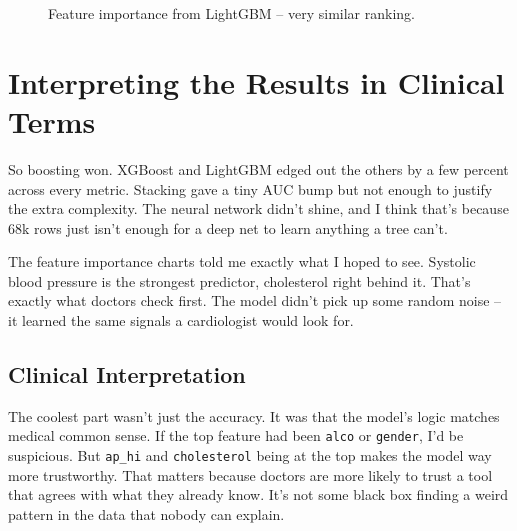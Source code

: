 \documentclass[12pt, a4paper, oneside]{book}
\begin{document}
\begin{figure}[H]
\centering
\vspace{12pt}
\vspace{12pt}
\caption{Feature importance from LightGBM – very similar ranking.}
\label{fig:feature_importance_lgbm}
\end{figure}

\section{Interpreting the Results in Clinical Terms}
So boosting won. XGBoost and LightGBM edged out the others by a few percent across every metric. Stacking gave a tiny AUC bump but not enough to justify the extra complexity. The neural network didn't shine, and I think that's because 68k rows just isn't enough for a deep net to learn anything a tree can't.

The feature importance charts told me exactly what I hoped to see. Systolic blood pressure is the strongest predictor, cholesterol right behind it. That's exactly what doctors check first. The model didn't pick up some random noise – it learned the same signals a cardiologist would look for.

\subsection{Clinical Interpretation}
The coolest part wasn't just the accuracy. It was that the model's logic matches medical common sense. If the top feature had been \texttt{alco} or \texttt{gender}, I'd be suspicious. But \texttt{ap\_hi} and \texttt{cholesterol} being at the top makes the model way more trustworthy. That matters because doctors are more likely to trust a tool that agrees with what they already know. It's not some black box finding a weird pattern in the data that nobody can explain.
\end{document}

